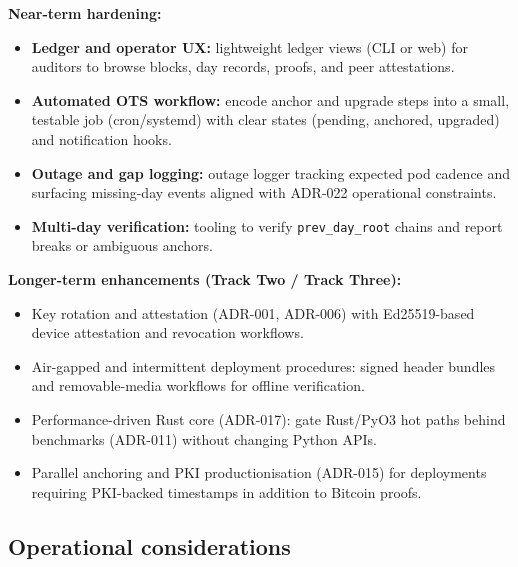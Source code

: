 \textbf{Near-term hardening:}
\begin{itemize}[nosep]
    \item \textbf{Ledger and operator UX:} lightweight ledger views (\ac{CLI} or web) for auditors to browse blocks, day records, proofs, and peer attestations.
    \item \textbf{Automated OTS workflow:} encode anchor and upgrade steps into a small, testable job (cron/systemd) with clear states (pending, anchored, upgraded) and notification hooks.
    \item \textbf{Outage and gap logging:} outage logger tracking expected pod cadence and surfacing missing-day events aligned with \ac{ADR}-022 operational constraints.
    \item \textbf{Multi-day verification:} tooling to verify \texttt{prev\_day\_root} chains and report breaks or ambiguous anchors.
\end{itemize}

\textbf{Longer-term enhancements (Track Two / Track Three):}
\begin{itemize}[nosep]
    \item Key rotation and attestation (\ac{ADR}-001, \ac{ADR}-006) with Ed25519-based device attestation and revocation workflows.
    \item Air-gapped and intermittent deployment procedures: signed header bundles and removable-media workflows for offline verification.
    \item Performance-driven Rust core (\ac{ADR}-017): gate Rust/PyO3 hot paths behind benchmarks (\ac{ADR}-011) without changing Python \ac{API}s.
    \item Parallel anchoring and \ac{PKI} productionisation (\ac{ADR}-015) for deployments requiring \ac{PKI}-backed timestamps in addition to Bitcoin proofs.
\end{itemize}

\subsection{Operational considerations}
\label{subsec:operational-considerations}

